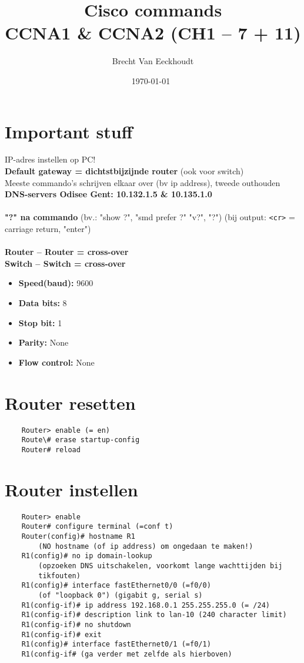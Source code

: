 \documentclass[10pt, a4paper]{article}
\title{Cisco commands \\CCNA1 \& CCNA2 (CH1 -- 7 + 11)}
\author{Brecht Van Eeckhoudt}
\date{\today \ \currenttime}
\begin{document}
	\maketitle
	
	\section{Important stuff}
	IP-adres instellen op PC!\\
	\textbf{Default gateway = dichtstbijzijnde router }(ook voor switch)\\
	Meeste commando's schrijven elkaar over (bv ip address), tweede outhouden\\
	\textbf{DNS-servers Odisee Gent: 10.132.1.5 \& 10.135.1.0}\\ \\
	\textbf{"?" na commando} (bv.: "show ?", "smd prefer ?" "v?", "?") (bij output: \texttt{<cr>} = carriage return, "enter")\\ \\
	\textbf{Router -- Router = cross-over}\\
	\textbf{Switch -- Switch = cross-over}\\
	\begin{itemize}[noitemsep,nolistsep]
		\item \textbf{Speed(baud):} 9600
		\item \textbf{Data bits:} 8
		\item \textbf{Stop bit:} 1
		\item \textbf{Parity:} None
		\item \textbf{Flow control:} None\\
	\end{itemize}
	
	\section{Router resetten}
	\begin{lstlisting}
	Router> enable (= en)
	Route\# erase startup-config
	Router# reload
	\end{lstlisting}
	
	\section{Router instellen}
	\begin{lstlisting}
	Router> enable
	Router# configure terminal (=conf t)
	Router(config)# hostname R1 
		(NO hostname (of ip address) om ongedaan te maken!)
	R1(config)# no ip domain-lookup 
		(opzoeken DNS uitschakelen, voorkomt lange wachttijden bij
		tikfouten)
	R1(config)# interface fastEthernet0/0 (=f0/0) 
		(of "loopback 0") (gigabit g, serial s)
	R1(config-if)# ip address 192.168.0.1 255.255.255.0 (= /24)
	R1(config-if)# description link to lan-10 (240 character limit)
	R1(config-if)# no shutdown
	R1(config-if)# exit
	R1(config)# interface fastEthernet0/1 (=f0/1)
	R1(config-if# (ga verder met zelfde als hierboven)
	\end{lstlisting}
	
\end{document}
